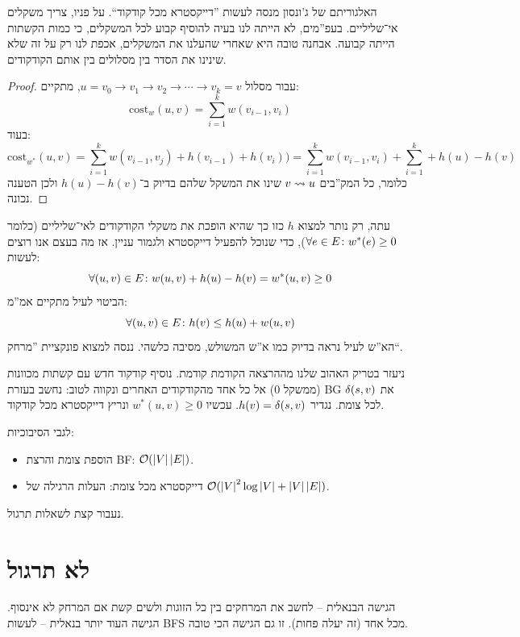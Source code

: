 \documentclass[]{../../../../tex/classes/styledArticle}
\begin{document}
	האלגוריתם של ג'ונסון מנסה לעשות ''דייקסטרא מכל קודקוד``. על פניו, צריך משקלים אי־שליליים. בעפ''מים, לא הייתה לנו בעיה להוסיף קבוע לכל המשקלים, כי כמות הקשתות הייתה קבועה. אבחנה טובה היא שאחרי שהעלנו את המשקלים, אכפת לנו רק על זה שלא שינינו את הסדר בין מסלולים בין אותם הקודקודים. 
	
	\begin{proof}
		עבור מסלול $u = v_0 \to v_1 \to v_2 \to \cdots \to v_k = v$, מתקיים: 
		\[ \mathrm{cost}_w(u, v) = \sum_{i = 1}^{k} w(v_{i - 1}, v_i)   \]
		בעוד: 
		\[ \mathrm{cost}_{w^*}(u, v) = \sum_{i = 1}^{k}w(v_{i - 1}, v_j) + h(v_{i - 1}) + h(v_i)) = \sum_{i = 1}^{k} w(v_{i - 1}, v_i) + \sum_{i = 1}^{k} + h(u) - h(v) \]
		כלומר, כל המק''בים $v \rightsquigarrow u$ שינו את המשקל שלהם בדיוק ב־$h(u) - h(v)$ ולכן הטענה נכונה. 
	\end{proof}
	
	עתה, רק נותר למצוא $h$ כזו כך שהיא הופכת את משקלי הקודקודים לאי־שליליים (כלומר $\forall e \in E \colon w^*(e) \ge 0$), כדי שנוכל להפעיל דייקסטרא ולגמור עניין. 
	אז מה בעצם אנו רוצים לעשות: 
	\[ \forall (u, v) \in E \colon w(u, v) + h(u) - h(v) = w^*(u, v) \ge 0 \]
	הביטוי לעיל מתקיים אמ''מ: 
	\[ \forall (u, v) \in E \colon h(v) \le h(u) + w(u, v) \]
	הא''ש לעיל נראה בדיוק כמו א''ש המשולש, מסיבה כלשהי. ננסה למצוא פונקציית ''מרחק``. 
	
	ניעזר בטריק האהוב שלנו מההרצאה הקודמת קודמת. נוסיף קודקוד חדש עם קשתות מכוונות (ממשקל $0$) אל כל אחד מהקודקודים האחרים ונקווה לטוב: נחשב בעזרת BG את $\delta(s, v)$ לכל צומת. נגדיר $h(v) = \delta(s, v)$. עכשיו $w^*(u, v) \ge 0$ ונריץ דייקסטרא מכל קודקוד. 
	
	לגבי הסיבוכיות: 
	\begin{itemize}
		\item הוספת צומת והרצת BF: $\mathcal{O}(\left \lvert V \right \rvert \left \lvert E \right \rvert)$. 
		\item דייקסטרא מכל צומת: העלות הרגילה של $\mathcal{O}(\left \lvert V \right \rvert^2 \log \left \lvert V \right \rvert  + \left \lvert V \right \rvert \left \lvert E \right \rvert)$. 
	\end{itemize}
	
	נעבור קצת לשאלות תרגול. 
	
	\section*{לא תרגול}
	הגישה הבנאלית – לחשב את המרחקים בין כל הזוגות ולשים קשת אם המרחק לא אינסוף. הגישה העוד יותר בנאלית – לעשות BFS מכל אחד (זה יעלה פחות). זו גם הגישה הכי טובה. 
	
\end{document}
